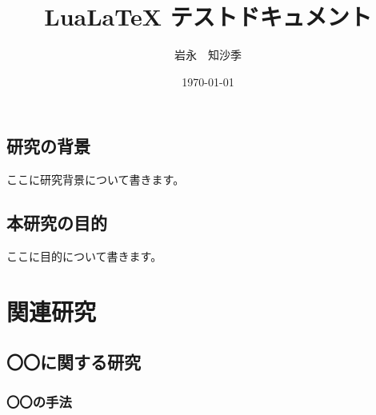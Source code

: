 \documentclass[a4paper]{ltjsreport}
\title{LuaLaTeX テストドキュメント}
\author{岩永　知沙季}
\date{\today}
\begin{document}
\maketitle

\tableofcontents %



\section{研究の背景}
ここに研究背景について書きます。

\section{本研究の目的}
ここに目的について書きます。

\chapter{関連研究}
\section{〇〇に関する研究}
\subsection{〇〇の手法}
\end{document}
